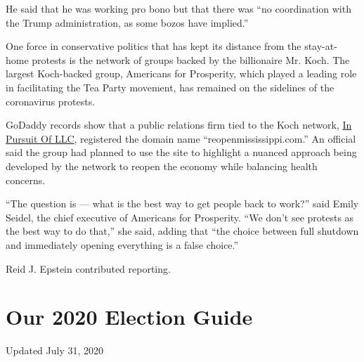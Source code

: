 He said that he was working pro bono but that there was ``no
coordination with the Trump administration, as some bozos have
implied.''

One force in conservative politics that has kept its distance from the
stay-at-home protests is the network of groups backed by the billionaire
Mr. Koch. The largest Koch-backed group, Americans for Prosperity, which
played a leading role in facilitating the Tea Party movement, has
remained on the sidelines of the coronavirus protests.

GoDaddy records show that a public relations firm tied to the Koch
network,
\href{https://www.politico.com/story/2016/12/koch-brothers-announce-layoffs-232341}{In
Pursuit Of LLC}, registered the domain name ``reopenmississippi.com.''
An official said the group had planned to use the site to highlight a
nuanced approach being developed by the network to reopen the economy
while balancing health concerns.

``The question is --- what is the best way to get people back to work?''
said Emily Seidel, the chief executive of Americans for Prosperity. ``We
don't see protests as the best way to do that,'' she said, adding that
``the choice between full shutdown and immediately opening everything is
a false choice.''

Reid J. Epstein contributed reporting.

\hypertarget{our-2020-election-guide}{%
\section{Our 2020 Election Guide}\label{our-2020-election-guide}}

Updated July 31, 2020

